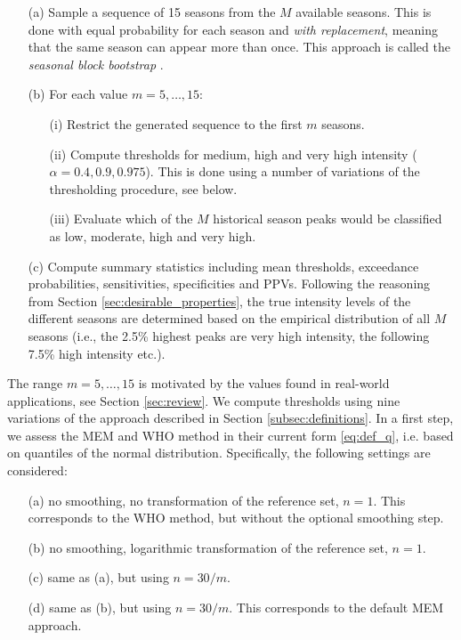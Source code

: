 \documentclass[12pt]{article}
\begin{document}
\begin{itemize}
\item[(a)] Sample a sequence of 15 seasons from the $M$ available seasons. This is done with equal probability for each season and \textit{with replacement}, meaning that the same season can appear more than once. This approach is called the \textit{seasonal block bootstrap} \citep{Politis2001}.
\item[(b)] For each value $m = 5, \dots, 15$:
\begin{itemize}
\item[(i)] Restrict the generated sequence to the first $m$ seasons.
\item[(ii)] Compute thresholds for medium, high and very high intensity ($\alpha = 0.4, 0.9, 0.975$). This is done using a number of variations of the thresholding procedure, see below.
\item[(iii)] Evaluate which of the $M$ historical season peaks would be classified as low, moderate, high and very high.
\end{itemize}
\item[(c)] Compute summary statistics including mean thresholds, exceedance probabilities, sensitivities, specificities and PPVs. Following the reasoning from Section \ref{sec:desirable_properties}, the true intensity levels of the different seasons are determined based on the empirical distribution of all $M$ seasons (i.e., the 2.5\% highest peaks are very high intensity, the following 7.5\% high intensity etc.).
\end{itemize}
The range $m =5, \dots, 15$ is motivated by the values found in real-world applications, see Section \ref{sec:review}. We compute thresholds using nine variations of the approach described in Section \ref{subsec:definitions}. In a first step, we assess the MEM and WHO method in their current form \eqref{eq:def_q}, i.e. based on quantiles of the normal distribution. Specifically, the following settings are considered:
\begin{enumerate}
\item[(a)] no smoothing, no transformation of the reference set, $n = 1$. This corresponds to the WHO method, but without the optional smoothing step.
\item[(b)] no smoothing, logarithmic transformation of the reference set, $n = 1$.
\item[(c)] same as (a), but using $n = 30/m$.
\item[(d)] same as (b), but using $n = 30/m$. This corresponds to the default MEM approach.
\end{enumerate}
\end{document}
